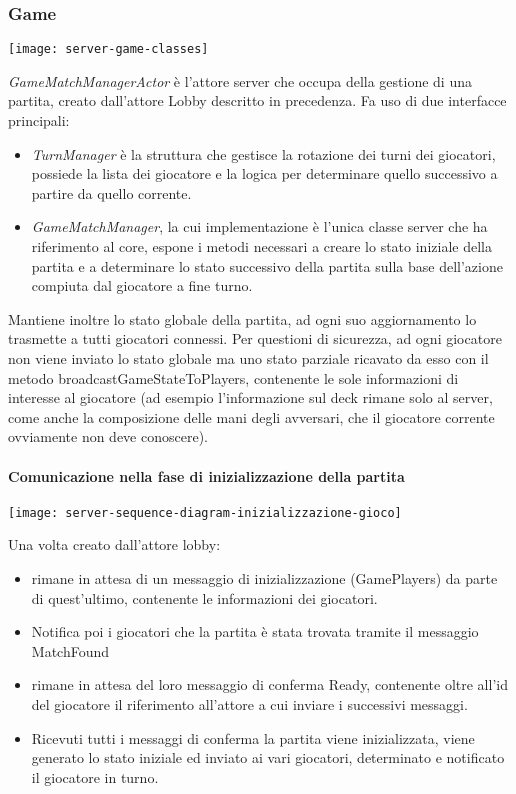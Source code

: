 \subsubsection{Game}
\begin{center}
    \texttt{[image: server-game-classes]}
\end{center}
\textit{GameMatchManagerActor} è l’attore server che occupa della gestione di una partita, creato dall’attore Lobby descritto in precedenza.
Fa uso di due interfacce principali:
\begin{itemize}
    \item \textit{TurnManager} è la struttura che gestisce la rotazione dei turni dei giocatori, possiede la lista dei giocatore e la logica per determinare quello successivo a partire da quello corrente.
    \item \textit{GameMatchManager}, la cui implementazione è l’unica classe server che ha riferimento al core, espone i metodi necessari a creare lo stato iniziale della partita e a determinare lo stato successivo della partita sulla base dell’azione compiuta dal giocatore a fine turno.
\end{itemize}
Mantiene inoltre lo stato globale della partita, ad ogni suo aggiornamento lo trasmette a tutti giocatori connessi.
Per questioni di sicurezza, ad ogni giocatore non viene inviato lo stato globale ma uno stato parziale ricavato da esso con il metodo broadcastGameStateToPlayers, contenente le sole informazioni di interesse al giocatore (ad esempio l’informazione sul deck rimane solo al server, come anche la composizione delle mani degli avversari, che il giocatore corrente ovviamente non deve conoscere).

\paragraph{Comunicazione nella fase di inizializzazione della partita}
\begin{center}
    \texttt{[image: server-sequence-diagram-inizializzazione-gioco]}
\end{center}
Una volta creato dall’attore lobby:
\begin{itemize}
    \item rimane in attesa di un messaggio di inizializzazione (GamePlayers) da parte di quest’ultimo, contenente le informazioni dei giocatori.
    \item Notifica poi i giocatori che la partita è stata trovata tramite il messaggio MatchFound
    \item rimane in attesa del loro messaggio di conferma Ready, contenente oltre all’id del giocatore il riferimento all’attore a cui inviare i successivi messaggi.
    \item Ricevuti tutti i messaggi di conferma la partita viene inizializzata, viene generato lo stato iniziale ed inviato ai vari giocatori, determinato e notificato il giocatore in turno.
\end{itemize}

